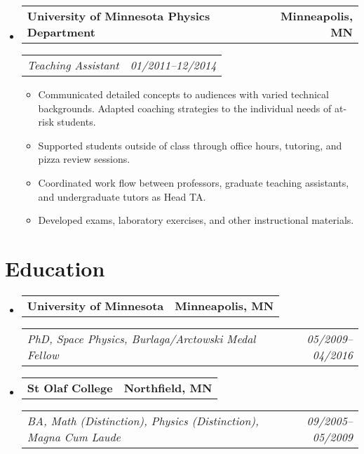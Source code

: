 \documentclass[11pt,letterpaper]{article}
\makeatletter
\newcommand{\headerrow}[2]{
  \begin{tabular*}{\linewidth}{l@{ \extracolsep{\fill} }r} #1 & #2 
  \end{tabular*}}
\newcommand{\YearRange}[2]{#1--#2}
\newcommand{\ResumeSection}[1]{
  \section*{ {\color{MidnightBlue}#1 \sout{\hfill} } } }
\makeatother
\begin{document}
\begin{itemize}[leftmargin=\parindent]
  \item[]
    \headerrow{ \textbf{University of Minnesota Physics Department} }
              { \textbf{Minneapolis, MN} }
    \headerrow{ \emph{Teaching Assistant} }
              { \emph{ \YearRange{01/2011}{12/2014} } }
    \begin{itemize}
      \item Communicated detailed concepts to audiences with varied technical
            backgrounds. Adapted coaching strategies to the individual needs of
            at-risk students. 
      \item Supported students outside of class through office hours, tutoring,
            and pizza review sessions. 
      \item Coordinated work flow between professors, graduate teaching
            assistants, and undergraduate tutors as Head TA. 
      \item Developed exams, laboratory exercises, and other instructional
            materials. 
    \end{itemize}

\end{itemize}


\ResumeSection{Education}

\begin{itemize}[leftmargin=\parindent]
  \parskip=0.1em

  \item[]
    \headerrow{ \textbf{University of Minnesota} }{ \textbf{Minneapolis, MN} }
    \headerrow{ \emph{PhD, Space Physics, Burlaga/Arctowski Medal Fellow} }
              { \emph{ \YearRange{05/2009}{04/2016} } }

    \item[]
      \headerrow{ \textbf{St Olaf College} }{ \textbf{Northfield, MN} }
      \headerrow{ \emph{BA, Math (Distinction), Physics (Distinction), 
                 Magna Cum Laude} }
                { \emph{ \YearRange{09/2005}{05/2009} } }

\end{itemize}


\end{document}
